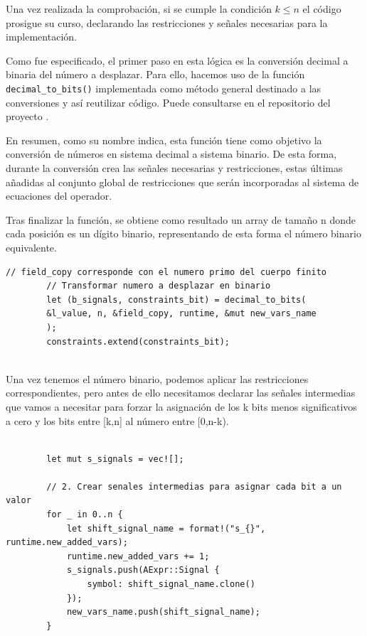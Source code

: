 \documentclass[a4paper,12pt]{report}
\begin{document}
	\vspace{0.2cm}
	\noindent Una vez realizada la comprobación, si se cumple la condición $k \leq n$ el código prosigue su curso, declarando las restricciones y señales necesarias para la implementación.
	
	\vspace{0.2cm}
	\noindent Como fue especificado, el primer paso en esta lógica es la conversión decimal a binaria del número a desplazar. Para ello, hacemos uso de la función \texttt{decimal\_to\_bits()} implementada como método general destinado a las conversiones y así reutilizar código. Puede consultarse en el repositorio del proyecto \cite{circom_autocomplete}.
	
	\vspace{0.2cm}
	\noindent En resumen, como su nombre indica, esta función tiene como objetivo la conversión de números en sistema decimal a sistema binario. De esta forma, durante la conversión crea las señales necesarias y restricciones, estas últimas añadidas al conjunto global de restricciones que serán incorporadas al sistema de ecuaciones del operador.
	
	\vspace{0.2cm}
	\noindent  Tras finalizar la función, se obtiene como resultado un array de tamaño n donde cada posición es un dígito binario, representando de esta forma el número binario equivalente.
	
	
	\vspace{0.3cm}
	\begin{lstlisting}[style=RustStyle, caption={},         basicstyle=\ttfamily\scriptsize, 
		xleftmargin=0pt
		]
		// field_copy corresponde con el numero primo del cuerpo finito
		// Transformar numero a desplazar en binario
		let (b_signals, constraints_bit) = decimal_to_bits(
		&l_value, n, &field_copy, runtime, &mut new_vars_name
		);
		constraints.extend(constraints_bit);
		
	\end{lstlisting}
	
	
	\vspace{0.2cm}
	\noindent Una vez tenemos el número binario, podemos aplicar las restricciones correspondientes, pero antes de ello necesitamos declarar las señales intermedias que vamos a necesitar para forzar la asignación de los k bits menos significativos a cero y los bits entre [k,n] al número entre [0,n-k).
	
	\vspace{0.3cm}
	\begin{lstlisting}[style=RustStyle, caption={},         basicstyle=\ttfamily\scriptsize, 
		xleftmargin=0pt
		]
		
		let mut s_signals = vec![];
		
		// 2. Crear senales intermedias para asignar cada bit a un valor
		for _ in 0..n {
			let shift_signal_name = format!("s_{}", runtime.new_added_vars);
			runtime.new_added_vars += 1;
			s_signals.push(AExpr::Signal {
				symbol: shift_signal_name.clone()
			});
			new_vars_name.push(shift_signal_name);
		}
		
	\end{lstlisting}
	
\end{document}
